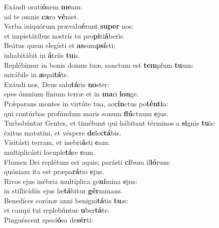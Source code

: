 \evenverse Exáudi orati\textbf{ó}nem \textbf{me}am:~\*\\
\evenverse ad te omnis \textbf{ca}ro \textbf{vé}niet.\\
\oddverse Verba iniquórum prævalu\textbf{é}runt \textbf{su}\textbf{per} nos:~\*\\
\oddverse et impietátibus nostris tu pro\textbf{pi}ti\textbf{á}beris.\\
\evenverse Beátus quem elegísti et \textbf{as}sum\textbf{psí}sti:~\*\\
\evenverse inhabitábit in \textbf{á}triis \textbf{tu}is.\\
\oddverse Replébimur in bonis domus tuæ, sanctum est \textbf{tem}plum \textbf{tu}um:~\*\\
\oddverse mirábile in \textbf{æ}qui\textbf{tá}te.\\
\evenverse Exáudi nos, Deus salu\textbf{tá}ris \textbf{no}ster:~\*\\
\evenverse spes ómnium fínium terræ et in \textbf{ma}ri \textbf{lon}ge.\\
\oddverse Prǽparans montes in virtúte tua, ac\textbf{cín}ctus po\textbf{tén}\textbf{ti}a:~\*\\
\oddverse qui contúrbas profúndum maris sonum \textbf{flú}ctuum \textbf{e}jus.\\
\evenverse Turbabúntur Gentes, et timébunt qui hábitant términos a \textbf{si}gnis \textbf{tu}is:~\*\\
\evenverse éxitus matutíni, et véspere \textbf{de}le\textbf{ctá}bis.\\
\oddverse Visitásti terram, et inebri\textbf{á}sti \textbf{e}am:~\*\\
\oddverse multiplicásti locuple\textbf{tá}re \textbf{e}am.\\
\evenverse Flumen Dei replétum est aquis; parásti \textbf{ci}bum il\textbf{ló}rum:~\*\\
\evenverse quóniam ita est præpa\textbf{rá}tio \textbf{e}jus.\\
\oddverse Rivos ejus inébria multíplica ge\textbf{ní}mina \textbf{e}jus:~\*\\
\oddverse in stillicídiis ejus læ\textbf{tá}bitur \textbf{gér}minans.\\
\evenverse Benedíces corónæ anni benigni\textbf{tá}tis \textbf{tu}æ:~\*\\
\evenverse et campi tui replebúntur \textbf{u}ber\textbf{tá}te.\\
\oddverse Pinguéscent speci\textbf{ó}sa de\textbf{sér}ti:~\*\\
